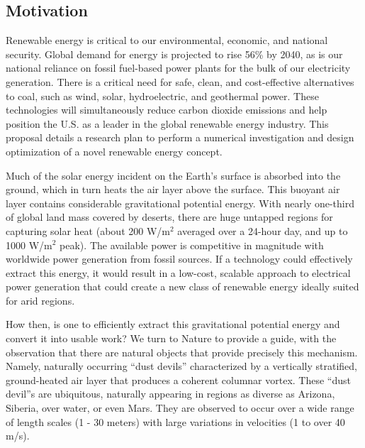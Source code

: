\label{sec:intro}

%
%


\subsection{Motivation}

Renewable energy is critical to our environmental, economic, and
national security. Global demand for energy is projected to rise 56\% by
2040\cite{energy-outlook}, as is our national reliance on fossil
fuel-based power plants for the bulk of our electricity generation. 
There is a critical need for safe, clean, and
cost-effective alternatives to coal, such as wind, solar, hydroelectric,
and geothermal power. These technologies will simultaneously reduce
carbon dioxide emissions and help position the U.S. as a leader in the
global renewable energy industry. 
%
This proposal details a research plan to perform a numerical
investigation and design optimization of a novel renewable energy concept. 

Much of the solar energy incident on the Earth's surface is absorbed
into the ground, which in turn heats the air layer above the surface.
This buoyant air layer contains considerable gravitational potential
energy. 
With nearly one-third of global land mass covered by deserts, there are huge
untapped regions for capturing solar heat (about 200 W/$\text{m}^2$
averaged over a 24-hour day, and up to 1000 W/$\text{m}^2$
peak)\cite{Hoyt197827}. The available power is competitive in magnitude
with worldwide power generation from fossil sources. If a technology
could effectively extract this energy, it would result in a low-cost,
scalable approach to electrical power generation that could create a new
class of renewable energy ideally suited for arid regions.  

How then, is one to efficiently extract this gravitational potential
energy and convert it into usable work? We turn to Nature to provide a 
guide, with the observation that there are natural objects that provide
precisely this mechanism. Namely, naturally occurring ``dust devils'' 
characterized by a vertically stratified, ground-heated air layer
that produces a coherent columnar vortex. These ``dust devil''s are
ubiquitous, naturally appearing in regions as diverse as Arizona,
Siberia, over water, or even
Mars\cite{Sinclair1969,ROG:ROG1635,JGRE:JGRE1660}.  
They are observed to occur over a wide range of length scales (1 - 30
meters) with large variations in velocities (1 to over 40
m/s)\cite{Sinclair1969}. 

